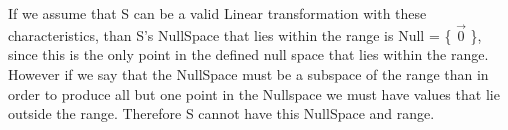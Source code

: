 \documentclass[12pt]{article}
\begin{document}
If we assume that S can be a valid Linear transformation with these characteristics, than S's NullSpace that lies within the range is Null = \{ $\vec{0}$ \}, since this is the only point in the defined null space that lies within the range.\\

However if we say that the NullSpace must be a subspace of the range than in order to produce all but one point in the Nullspace we must have values that lie outside the range. Therefore S cannot have this NullSpace and range.  
\end{document}
